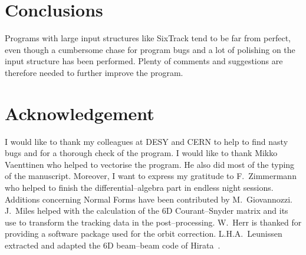\chapter{Conclusions}

Programs with large input structures like SixTrack tend to be far from perfect, even though a cumbersome chase for program bugs and a lot of polishing on the input structure has been performed.
Plenty of comments and suggestions are therefore needed to further improve the program.

\chapter{Acknowledgement}

I would like to thank my colleagues at DESY and CERN to help to find nasty bugs and for a thorough check of the program.
I would like to thank Mikko Vaenttinen who helped to vectorise the program.
He also did most of the typing of the manuscript.
Moreover, I want to express my gratitude to F.~Zimmermann who helped to finish the differential--algebra part in endless night sessions.
Additions concerning Normal Forms have been contributed by M.~Giovannozzi.
J.~Miles helped with the calculation of the 6D Courant--Snyder matrix and its use to transform the tracking data in the post--processing.
W.~Herr is thanked for providing a software package used for the orbit correction. L.H.A.~Leunissen extracted and adapted the 6D beam--beam code of Hirata~\cite{Hirata}.

